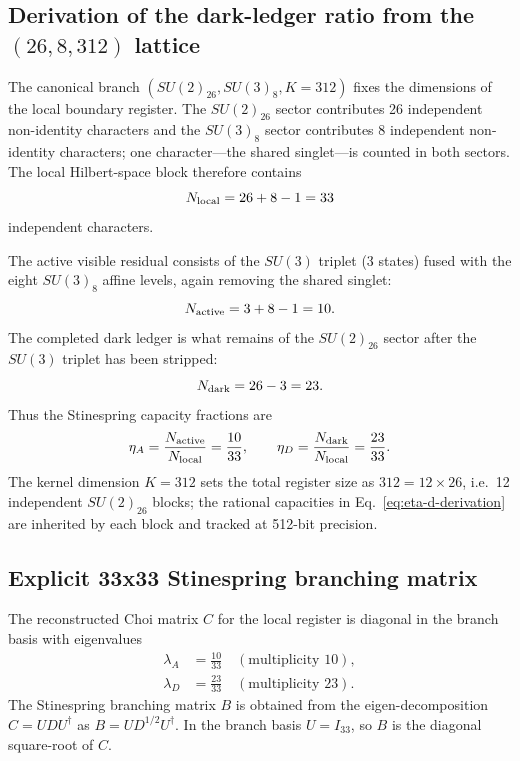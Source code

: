 \documentclass[aps,pra,10pt,onecolumn,superscriptaddress,nofootinbib,longbibliography,floatfix]{revtex4-2}
\begin{document}
\subsection{Derivation of the dark-ledger ratio from the \texorpdfstring{$(26,8,312)$}{(26,8,312)} lattice}

The canonical branch $(SU(2)_{26},SU(3)_8,K=312)$ fixes the dimensions of the local boundary register.  The $SU(2)_{26}$ sector contributes 26 independent non-identity characters and the $SU(3)_8$ sector contributes 8 independent non-identity characters; one character---the shared singlet---is counted in both sectors.  The local Hilbert-space block therefore contains
%
\begin{equation}
N_{\rm local} = 26 + 8 - 1 = 33
\end{equation}
%
independent characters.

The active visible residual consists of the $SU(3)$ triplet (3 states) fused with the eight $SU(3)_8$ affine levels, again removing the shared singlet:
%
\begin{equation}
N_{\rm active} = 3 + 8 - 1 = 10.
\end{equation}
%
The completed dark ledger is what remains of the $SU(2)_{26}$ sector after the $SU(3)$ triplet has been stripped:
%
\begin{equation}
N_{\rm dark} = 26 - 3 = 23.
\end{equation}
%
Thus the Stinespring capacity fractions are
%
\begin{equation}
\label{eq:eta-d-derivation}
\eta_A = \frac{N_{\rm active}}{N_{\rm local}} = \frac{10}{33},
\qquad
\eta_D = \frac{N_{\rm dark}}{N_{\rm local}} = \frac{23}{33}.
\end{equation}
%
The kernel dimension $K=312$ sets the total register size as $312 = 12 \times 26$, i.e.~12 independent $SU(2)_{26}$ blocks; the rational capacities in Eq.~\eqref{eq:eta-d-derivation} are inherited by each block and tracked at 512-bit precision.

\subsection{Explicit 33x33 Stinespring branching matrix}

The reconstructed Choi matrix $C$ for the local register is diagonal in the branch basis with eigenvalues
%
\begin{align}
\lambda_A &= \frac{10}{33} \quad (\text{multiplicity } 10), \\
\lambda_D &= \frac{23}{33} \quad (\text{multiplicity } 23).
\end{align}
%
The Stinespring branching matrix $B$ is obtained from the eigen-decomposition $C = U D U^\dagger$ as $B = U D^{1/2} U^\dagger$.  In the branch basis $U = I_{33}$, so $B$ is the diagonal square-root of $C$.
\end{document}
